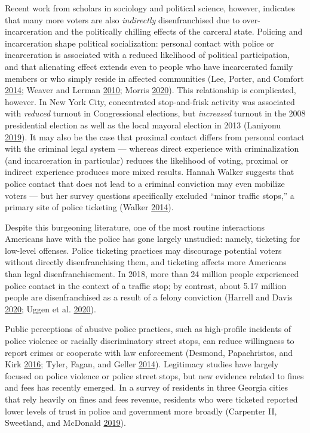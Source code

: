 \documentclass[
  12pt,
]{article}
\begin{document}
Recent work from scholars in sociology and political science, however, indicates that many more voters are also \emph{indirectly} disenfranchised due to over-incarceration and the politically chilling effects of the carceral state. Policing and incarceration shape political socialization: personal contact with police or incarceration is associated with a reduced likelihood of political participation, and that alienating effect extends even to people who have incarcerated family members or who simply reside in affected communities (Lee, Porter, and Comfort \protect\hyperlink{ref-Lee2014}{2014}; Weaver and Lerman \protect\hyperlink{ref-Weaver2010}{2010}; Morris \protect\hyperlink{ref-Morris2020}{2020}). This relationship is complicated, however. In New York City, concentrated stop-and-frisk activity was associated with \emph{reduced} turnout in Congressional elections, but \emph{increased} turnout in the 2008 presidential election as well as the local mayoral election in 2013 (Laniyonu \protect\hyperlink{ref-Laniyonu2019}{2019}). It may also be the case that proximal contact differs from personal contact with the criminal legal system --- whereas direct experience with criminalization (and incarceration in particular) reduces the likelihood of voting, proximal or indirect experience produces more mixed results. Hannah Walker suggests that police contact that does not lead to a criminal conviction may even mobilize voters --- but her survey questions specifically excluded ``minor traffic stops,'' a primary site of police ticketing (Walker \protect\hyperlink{ref-Walker2014}{2014}).

Despite this burgeoning literature, one of the most routine interactions Americans have with the police has gone largely unstudied: namely, ticketing for low-level offenses. Police ticketing practices may discourage potential voters without directly disenfranchising them, and ticketing affects more Americans than legal disenfranchisement. In 2018, more than 24 million people experienced police contact in the context of a traffic stop; by contrast, about 5.17 million people are disenfranchised as a result of a felony conviction (Harrell and Davis \protect\hyperlink{ref-Harrell2020}{2020}; Uggen et al. \protect\hyperlink{ref-Uggen2020}{2020}).

Public perceptions of abusive police practices, such as high-profile incidents of police violence or racially discriminatory street stops, can reduce willingness to report crimes or cooperate with law enforcement (Desmond, Papachristos, and Kirk \protect\hyperlink{ref-Desmond2016}{2016}; Tyler, Fagan, and Geller \protect\hyperlink{ref-Tyler2014}{2014}). Legitimacy studies have largely focused on police violence or police street stops, but new evidence related to fines and fees has recently emerged.
In a survey of residents in three Georgia cities that rely heavily on fines and fees revenue, residents who were ticketed reported lower levels of trust in police and government more broadly (Carpenter II, Sweetland, and McDonald \protect\hyperlink{ref-CarpenterII2019}{2019}).
\end{document}
